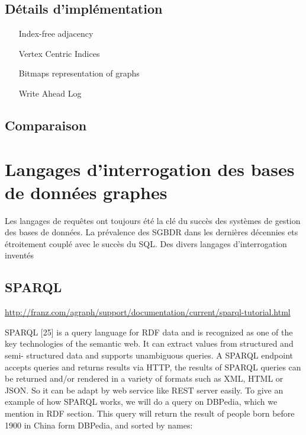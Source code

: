   \subsection{Détails d'implémentation}
  \label{graph-internals}
  \begin{itemize}
  \item [Index-free adjacency]
  \item [Vertex Centric Indices]
  \item [Bitmaps representation of graphs]
  \item [Write Ahead Log]
  \end{itemize}

  \subsection{Comparaison}
  \label{graphdb-comp}

\newpage
\section{Langages d'interrogation des bases de données graphes}
\label{query-languages}

Les langages de requêtes ont toujours été la clé du succès des
systèmes de gestion des bases de données. La prévalence des
\acrshort{SGBDR} dans les dernières décennies ets étroitement couplé
avec le succès du \textsc{SQL}. Des divers langages d'interrogation
inventés

  \subsection{SPARQL}
  \label{sparql}


  {\color{red}
    \url{http://franz.com/agraph/support/documentation/current/sparql-tutorial.html}
  }\newpage

  SPARQL [25] is a query language for RDF data and is recognized as
  one of the key technologies of the semantic web. It can extract
  values from structured and semi- structured data and supports
  unambiguous queries. A SPARQL endpoint accepts queries and returns
  results via HTTP, the results of SPARQL queries can be returned
  and/or rendered in a variety of formats such as XML, HTML or
  JSON. So it can be adapt by web service like REST server easily.  To
  give an example of how SPARQL works, we will do a query on DBPedia,
  which we mention in RDF section. This query will return the result
  of people born before 1900 in China form DBPedia, and sorted by
  names:

